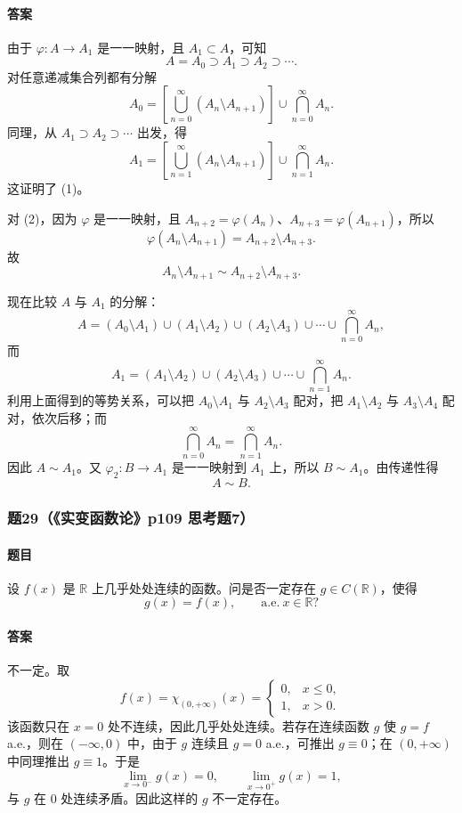 \documentclass{article}
\newcommand{\R}{\mathbb{R}}
\newcommand{\ind}{\chi}
\newcommand{\aee}{\text{a.e.}}
\begin{document}
\paragraph{答案}由于 $\varphi:A\to A_1$ 是一一映射，且 $A_1\subset A$，可知
\[
A=A_0\supset A_1\supset A_2\supset\cdots.
\]
对任意递减集合列都有分解
\[
A_0=\left[\bigcup_{n=0}^{\infty}(A_n\setminus A_{n+1})\right]\cup\bigcap_{n=0}^{\infty}A_n.
\]
同理，从 $A_1\supset A_2\supset\cdots$ 出发，得
\[
A_1=\left[\bigcup_{n=1}^{\infty}(A_n\setminus A_{n+1})\right]\cup\bigcap_{n=1}^{\infty}A_n.
\]
这证明了 (1)。

对 (2)，因为 $\varphi$ 是一一映射，且 $A_{n+2}=\varphi(A_n)$、$A_{n+3}=\varphi(A_{n+1})$，所以
\[
\varphi(A_n\setminus A_{n+1})=A_{n+2}\setminus A_{n+3}.
\]
故
\[
A_n\setminus A_{n+1}\sim A_{n+2}\setminus A_{n+3}.
\]

现在比较 $A$ 与 $A_1$ 的分解：
\[
A=(A_0\setminus A_1)\cup(A_1\setminus A_2)\cup(A_2\setminus A_3)\cup\cdots\cup\bigcap_{n=0}^{\infty}A_n,
\]
而
\[
A_1=(A_1\setminus A_2)\cup(A_2\setminus A_3)\cup\cdots\cup\bigcap_{n=1}^{\infty}A_n.
\]
利用上面得到的等势关系，可以把 $A_0\setminus A_1$ 与 $A_2\setminus A_3$ 配对，把 $A_1\setminus A_2$ 与 $A_3\setminus A_4$ 配对，依次后移；而
\[
\bigcap_{n=0}^{\infty}A_n=\bigcap_{n=1}^{\infty}A_n.
\]
因此 $A\sim A_1$。又 $\varphi_2:B\to A_1$ 是一一映射到 $A_1$ 上，所以 $B\sim A_1$。由传递性得
\[
A\sim B.
\]

\subsubsection*{题29（《实变函数论》p109 思考题7）}
\paragraph{题目}设 $f(x)$ 是 $\R$ 上几乎处处连续的函数。问是否一定存在 $g\in C(\R)$，使得
\[
g(x)=f(x),\qquad \aee\ x\in\R?
\]

\paragraph{答案}不一定。取
\[
f(x)=\ind_{(0,+\infty)}(x)=
\begin{cases}
0,&x\le 0,\\
1,&x>0.
\end{cases}
\]
该函数只在 $x=0$ 处不连续，因此几乎处处连续。若存在连续函数 $g$ 使 $g=f$ a.e.，则在 $(-\infty,0)$ 中，由于 $g$ 连续且 $g=0$ a.e.，可推出 $g\equiv0$；在 $(0,+\infty)$ 中同理推出 $g\equiv1$。于是
\[
\lim_{x\to0^-}g(x)=0,
\qquad
\lim_{x\to0^+}g(x)=1,
\]
与 $g$ 在 $0$ 处连续矛盾。因此这样的 $g$ 不一定存在。
\end{document}
